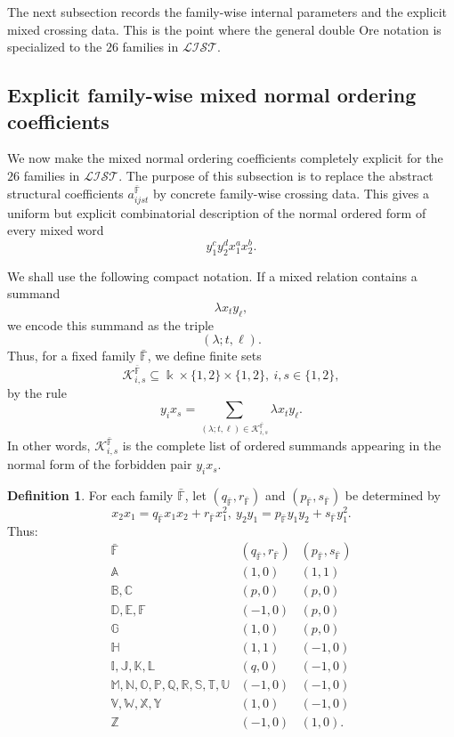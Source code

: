 \documentclass{amsart}
\theoremstyle{definition}
\newtheorem{definition}[theorem]{Definition}
\theoremstyle{remark}
\numberwithin{equation}{section}
\begin{document}
The next subsection records the family-wise internal parameters and the explicit mixed crossing data. This is the point where the general double Ore notation is specialized to the $26$ families in $\mathcal{LIST}$.

\subsection{Explicit family-wise mixed normal ordering coefficients}\label{SubsectionExplicitFamilywiseCoefficients}

We now make the mixed normal ordering coefficients completely explicit for the $26$ families in $\mathcal{LIST}$. The purpose of this subsection is to replace the abstract structural coefficients $a_{ijst}^{\bar{\mathbb{F}}}$ by concrete family-wise crossing data. This gives a uniform but explicit combinatorial description of the normal ordered form of every mixed word
\[
y_1^cy_2^dx_1^ax_2^b.
\]

We shall use the following compact notation. If a mixed relation contains a summand
\[
\lambda x_ty_\ell,
\]
we encode this summand as the triple
\[
(\lambda;t,\ell).
\]
Thus, for a fixed family $\bar{\mathbb{F}}$, we define finite sets
\[
\mathscr{K}_{i,s}^{\bar{\mathbb{F}}}
\subseteq
\Bbbk\times\{1,2\}\times\{1,2\},
\ i,s\in\{1,2\},
\]
by the rule
\begin{equation}\label{EquationCrossingKernelDefinition}
y_ix_s
=
\sum_{(\lambda;t,\ell)\in \mathscr{K}_{i,s}^{\bar{\mathbb{F}}}}
\lambda x_ty_\ell.
\end{equation}
In other words, $\mathscr{K}_{i,s}^{\bar{\mathbb{F}}}$ is the complete list of ordered summands appearing in the normal form of the forbidden pair $y_ix_s$.

\begin{definition}\label{DefinitionFamilyInternalParameters}
For each family $\bar{\mathbb{F}}$, let $(q_{\bar{\mathbb{F}}},r_{\bar{\mathbb{F}}})$ and $(p_{\bar{\mathbb{F}}},s_{\bar{\mathbb{F}}})$ be determined by
\[
x_2x_1=q_{\bar{\mathbb{F}}}x_1x_2+r_{\bar{\mathbb{F}}}x_1^2,
\
y_2y_1=p_{\bar{\mathbb{F}}}y_1y_2+s_{\bar{\mathbb{F}}}y_1^2.
\]
Thus:
\[
\begin{array}{c|c|c}
\bar{\mathbb{F}} & (q_{\bar{\mathbb{F}}},r_{\bar{\mathbb{F}}}) & (p_{\bar{\mathbb{F}}},s_{\bar{\mathbb{F}}})\\
\hline
\mathbb{A} & (1,0) & (1,1)\\
\mathbb{B},\mathbb{C} & (p,0) & (p,0)\\
\mathbb{D},\mathbb{E},\mathbb{F} & (-1,0) & (p,0)\\
\mathbb{G} & (1,0) & (p,0)\\
\mathbb{H} & (1,1) & (-1,0)\\
\mathbb{I},\mathbb{J},\mathbb{K},\mathbb{L} & (q,0) & (-1,0)\\
\mathbb{M},\mathbb{N},\mathbb{O},\mathbb{P},\mathbb{Q},\mathbb{R},\mathbb{S},\mathbb{T},\mathbb{U} & (-1,0) & (-1,0)\\
\mathbb{V},\mathbb{W},\mathbb{X},\mathbb{Y} & (1,0) & (-1,0)\\
\mathbb{Z} & (-1,0) & (1,0).
\end{array}
\]
\end{definition}
\end{document}
